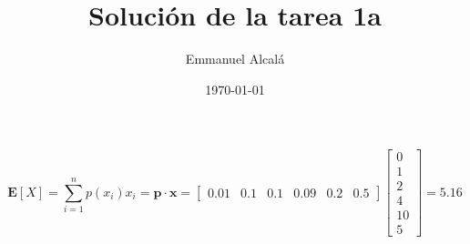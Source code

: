 \documentclass[12pt]{scrartcl} %
\title{Solución de la tarea 1a}
\author{Emmanuel Alcalá}
\date{\today}
\begin{document}
\maketitle


\begin{Exercise}[name={Respuesta}]

  \[\mathbf{E}[X] = \sum_{i=1}^n p(x_i)x_i = \mathbf{p\cdot x} =%
    \begin{bmatrix}
      0.01 & 0.1 & 0.1 & 0.09 & 0.2 & 0.5
    \end{bmatrix}
    \begin{bmatrix}
      0  \\
      1  \\
      2  \\
      4  \\
      10 \\
      5
    \end{bmatrix} = 5.16 \]

\end{Exercise}
\end{document}
